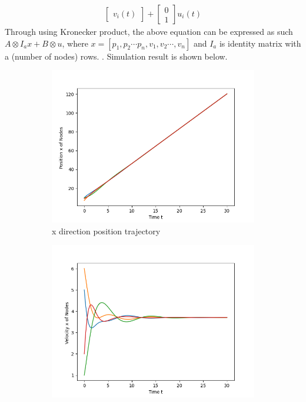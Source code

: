 \documentclass{article}
\begin{document}
\begin{problem}
\begin{align*}
\begin{bmatrix*}
            v_i(t)  
        \end{bmatrix*}
        + 
        \begin{bmatrix*}
            0\\
            1
        \end{bmatrix*} u_i(t)
    \end{align*}
    Through using Kronecker product, the above equation can be expressed as such $ A \otimes I_{a} x + B \otimes u $, where $x = [p_1, p_2 \cdots p_n, v_1, v_2 \cdots, v_n]$ and $I_{a}$ is identity matrix with a (number of nodes) rows. . Simulation result is shown below. 
    \newpage
    \begin{figure}[!h]
        \centering
        \begin{subfigure}{0.35\textwidth}
            \includegraphics[width=\textwidth]{./img/p1_1.png}
            \caption{x direction position trajectory}
        \end{subfigure}
        \begin{subfigure}{0.35\textwidth}
            \includegraphics[width=\textwidth]{./img/p1_2.png}

\end{subfigure}
\end{figure}
\end{problem}
\end{document}
